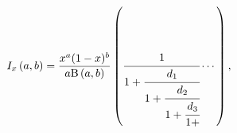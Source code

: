 \[I_{x}\left(a,b\right)=\frac{x^{a}(1-x)^{b}}{a\mathrm{B}\left(a,b\right)}\left(%
\cfrac{1}{1+\cfrac{d_{1}}{1+\cfrac{d_{2}}{1+\cfrac{d_{3}}{1+}}}}\cdots\right),\]